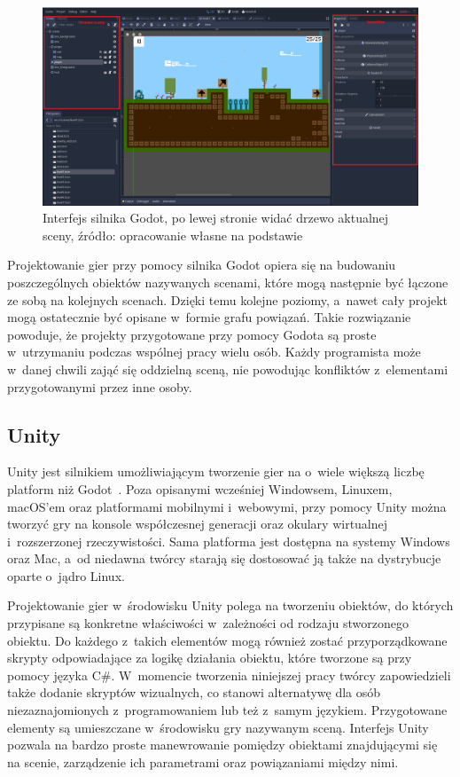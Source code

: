 \begin{figure}[h]
	\centering
	\includegraphics[width=0.9\linewidth]{images/godot_interface.png}
	\caption{Interfejs silnika Godot, po lewej stronie widać drzewo aktualnej sceny, źródło: opracowanie własne na podstawie~\cite{godot_documentation}}
	\label{fig:godot_interface}
\end{figure}

Projektowanie gier przy pomocy silnika Godot opiera się na budowaniu poszczególnych obiektów nazywanych scenami, które mogą następnie być łączone ze sobą na kolejnych scenach. Dzięki temu kolejne poziomy, a~nawet cały projekt mogą ostatecznie być opisane w~formie grafu powiązań. Takie rozwiązanie powoduje, że projekty przygotowane przy pomocy Godota są proste w~utrzymaniu podczas wspólnej pracy wielu osób. Każdy programista może w~danej chwili zająć się oddzielną sceną, nie powodując konfliktów z~elementami przygotowanymi przez inne osoby.

\subsection{Unity}
Unity jest silnikiem umożliwiającym tworzenie gier na o~wiele większą liczbę platform niż Godot~\cite{unity_manual}. Poza opisanymi wcześniej Windowsem, Linuxem, macOS'em oraz platformami mobilnymi i~webowymi, przy pomocy Unity można tworzyć gry na konsole współczesnej generacji oraz okulary wirtualnej i~rozszerzonej rzeczywistości. Sama platforma jest dostępna na systemy Windows oraz Mac, a~od niedawna twórcy starają się dostosować ją także na dystrybucje oparte o~jądro Linux. 

Projektowanie gier w~środowisku Unity polega na tworzeniu obiektów, do których przypisane są konkretne właściwości w~zależności od rodzaju stworzonego obiektu. Do każdego z~takich elementów mogą również zostać przyporządkowane skrypty odpowiadające za logikę działania obiektu, które tworzone są przy pomocy języka C\#. W~momencie tworzenia niniejszej pracy twórcy zapowiedzieli także dodanie skryptów wizualnych, co stanowi alternatywę dla osób niezaznajomionych z~programowaniem lub też z~samym językiem. Przygotowane elementy są umieszczane w~środowisku gry nazywanym sceną. Interfejs Unity pozwala na bardzo proste manewrowanie pomiędzy obiektami znajdującymi się na scenie, zarządzenie ich parametrami oraz powiązaniami między nimi.

